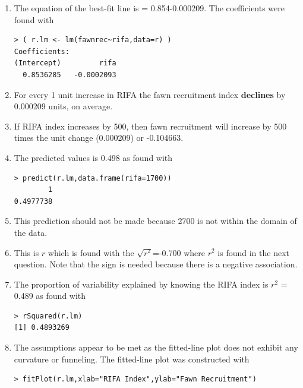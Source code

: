 \documentclass[10pt,openany]{book}\usepackage[]{graphicx}\usepackage[]{color}
\makeatletter
\newenvironment{kframe}{%
 \def\at@end@of@kframe{}%
 \ifinner\ifhmode%
  \def\at@end@of@kframe{\end{minipage}}%
  \begin{minipage}{\columnwidth}%
 \fi\fi%
 \def\FrameCommand##1{\hskip\@totalleftmargin \hskip-\fboxsep
 \colorbox{shadecolor}{##1}\hskip-\fboxsep
     \hskip-\linewidth \hskip-\@totalleftmargin \hskip\columnwidth}%
 \MakeFramed {\advance\hsize-\width
   \@totalleftmargin\z@ \linewidth\hsize
   \@setminipage}}%
 {\par\unskip\endMakeFramed%
 \at@end@of@kframe}
\newenvironment{knitrout}{}{} %
\makeatother
\begin{document}
\begin{itemize}
\begin{enumerate}
      \item The equation of the best-fit line is  = 0.854-0.000209.  The coefficients were found with
\begin{knitrout}
\color{fgcolor}\begin{kframe}
\begin{verbatim}
> ( r.lm <- lm(fawnrec~rifa,data=r) )
Coefficients:
(Intercept)         rifa  
  0.8536285   -0.0002093  
\end{verbatim}
\end{kframe}
\end{knitrout}
      \item For every 1 unit increase in RIFA the fawn recruitment index \textbf{declines} by 0.000209 units, on average.
      \item If RIFA index increases by 500, then fawn recruitment will increase by 500 times the unit change (0.000209) or -0.104663.
      \item The predicted values is 0.498 as found with
\begin{knitrout}
\color{fgcolor}\begin{kframe}
\begin{verbatim}
> predict(r.lm,data.frame(rifa=1700))
        1 
0.4977738 
\end{verbatim}
\end{kframe}
\end{knitrout}
      \item This prediction should not be made because 2700 is not within the domain of the data.
      \item This is $r$ which is found with the $\sqrt{r^{2}}$=-0.700 where $r^{2}$ is found in the next question.  Note that the sign is needed because there is a negative association.
      \item The proportion of variability explained by knowing the RIFA index is $r^{2}$ = 0.489 as found with
\begin{knitrout}
\color{fgcolor}\begin{kframe}
\begin{verbatim}
> rSquared(r.lm)
[1] 0.4893269
\end{verbatim}
\end{kframe}
\end{knitrout}
      \item The assumptions appear to be met as the fitted-line plot  does not exhibit any curvature or funneling.  The fitted-line plot was constructed with
\begin{knitrout}
\color{fgcolor}\begin{kframe}
\begin{verbatim}
> fitPlot(r.lm,xlab="RIFA Index",ylab="Fawn Recruitment")
\end{verbatim}
\end{kframe}\begin{figure}[hbtp]


\end{figure}
\end{knitrout}
\end{enumerate}
\end{itemize}
\end{document}
